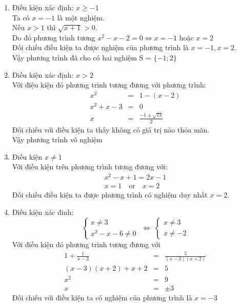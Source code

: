 \begin{enumerate}[label=(\alph*)]
\item Điều kiện xác định: $x \geq -1$ \\
Ta có $x=-1$ là một nghiệm. \\
Nếu $x > 1$ thì $\sqrt{x+1} > 0$. \\
Do đó phương trình tương  $x^2 - x -2 = 0 \Leftrightarrow x=-1$ hoặc $x=2$ \\
Đối chiếu điều kiện ta được nghiệm của phương trình là $x = -1, x = 2$. \\
Vậy phương trình đã cho có hai nghiệm S = $\{-1; 2\}$

\item Điều kiện xác định: $x > 2$ \\
 Với điệu kiện đó phương trình tương đương với phương trình:
\begin{eqnarray*}
x^2 &=& 1 - (x-2) \\
x^2 + x -3 &=& 0 \\
x &=& \frac{-1 \pm \sqrt{13}}{2}
\end{eqnarray*}
Đối chiếu với điều kiện ta thấy không có giá trị nào thỏa mãn. \\
Vậy phương trình vô nghiệm

\item Điều kiện $x \neq 1$ \\
Với điều kiện trên phương trình tương đương với:\\
\begin{eqnarray*}
x^2 - x + 1 = 2x -1 \\
x = 1 \quad \textrm{or} \quad x = 2
\end{eqnarray*}
Đối chiếu điều kiện ta được phương trình có nghiệm duy nhất $x = 2$.

\item Điều kiện xác đinh:
\begin{displaymath}
\left\{ \begin{array}{l}
x \neq 3 \\
x^2 -x -6 \neq 0
\end{array} \right.  \; \Leftrightarrow \; \left\{ \begin{array}{l}
x \neq 3 \\
x \neq -2
\end{array} \right.
\end{displaymath}
Với điều kiện đó phương trình tương đương với\\
\begin{eqnarray*}
1 + \frac{1}{x-3} &=& \frac{5}{(x-3)(x+2)} \\
(x-3)(x+2) + x + 2 &=& 5 \\
x^2 &=& 9 \\
x &=& \pm 3
\end{eqnarray*}
Đối chiếu với điều kiện ta có nghiệm của phương trình là $x = -3$
\end{enumerate}